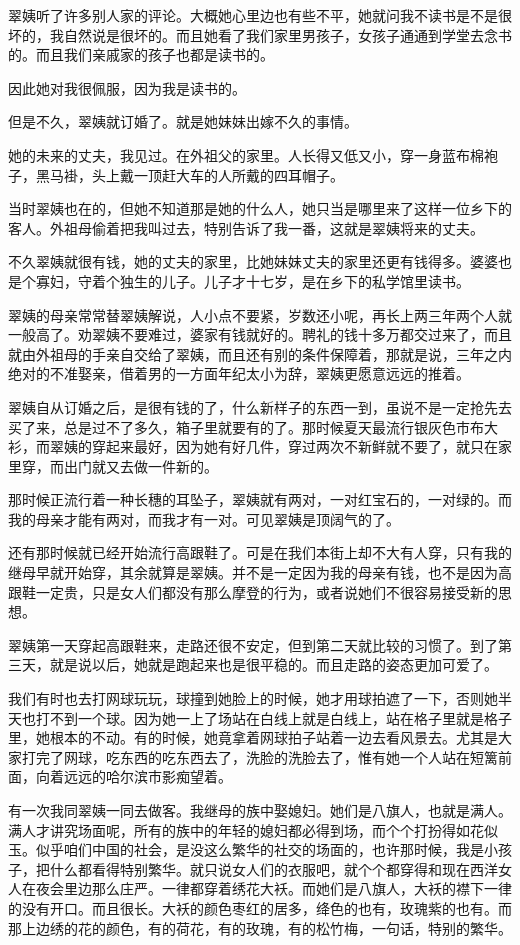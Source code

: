 \par 翠姨听了许多别人家的评论。大概她心里边也有些不平，她就问我不读书是不是很坏的，我自然说是很坏的。而且她看了我们家里男孩子，女孩子通通到学堂去念书的。而且我们亲戚家的孩子也都是读书的。
\par 因此她对我很佩服，因为我是读书的。
\par 但是不久，翠姨就订婚了。就是她妹妹出嫁不久的事情。
\par 她的未来的丈夫，我见过。在外祖父的家里。人长得又低又小，穿一身蓝布棉袍子，黑马褂，头上戴一顶赶大车的人所戴的四耳帽子。
\par 当时翠姨也在的，但她不知道那是她的什么人，她只当是哪里来了这样一位乡下的客人。外祖母偷着把我叫过去，特别告诉了我一番，这就是翠姨将来的丈夫。
\par 不久翠姨就很有钱，她的丈夫的家里，比她妹妹丈夫的家里还更有钱得多。婆婆也是个寡妇，守着个独生的儿子。儿子才十七岁，是在乡下的私学馆里读书。
\par 翠姨的母亲常常替翠姨解说，人小点不要紧，岁数还小呢，再长上两三年两个人就一般高了。劝翠姨不要难过，婆家有钱就好的。聘礼的钱十多万都交过来了，而且就由外祖母的手亲自交给了翠姨，而且还有别的条件保障着，那就是说，三年之内绝对的不准娶亲，借着男的一方面年纪太小为辞，翠姨更愿意远远的推着。
\par 翠姨自从订婚之后，是很有钱的了，什么新样子的东西一到，虽说不是一定抢先去买了来，总是过不了多久，箱子里就要有的了。那时候夏天最流行银灰色市布大衫，而翠姨的穿起来最好，因为她有好几件，穿过两次不新鲜就不要了，就只在家里穿，而出门就又去做一件新的。
\par 那时候正流行着一种长穗的耳坠子，翠姨就有两对，一对红宝石的，一对绿的。而我的母亲才能有两对，而我才有一对。可见翠姨是顶阔气的了。
\par 还有那时候就已经开始流行高跟鞋了。可是在我们本街上却不大有人穿，只有我的继母早就开始穿，其余就算是翠姨。并不是一定因为我的母亲有钱，也不是因为高跟鞋一定贵，只是女人们都没有那么摩登的行为，或者说她们不很容易接受新的思想。
\par 翠姨第一天穿起高跟鞋来，走路还很不安定，但到第二天就比较的习惯了。到了第三天，就是说以后，她就是跑起来也是很平稳的。而且走路的姿态更加可爱了。
\par 我们有时也去打网球玩玩，球撞到她脸上的时候，她才用球拍遮了一下，否则她半天也打不到一个球。因为她一上了场站在白线上就是白线上，站在格子里就是格子里，她根本的不动。有的时候，她竟拿着网球拍子站着一边去看风景去。尤其是大家打完了网球，吃东西的吃东西去了，洗脸的洗脸去了，惟有她一个人站在短篱前面，向着远远的哈尔滨市影痴望着。
\par 有一次我同翠姨一同去做客。我继母的族中娶媳妇。她们是八旗人，也就是满人。满人才讲究场面呢，所有的族中的年轻的媳妇都必得到场，而个个打扮得如花似玉。似乎咱们中国的社会，是没这么繁华的社交的场面的，也许那时候，我是小孩子，把什么都看得特别繁华。就只说女人们的衣服吧，就个个都穿得和现在西洋女人在夜会里边那么庄严。一律都穿着绣花大袄。而她们是八旗人，大袄的襟下一律的没有开口。而且很长。大袄的颜色枣红的居多，绛色的也有，玫瑰紫的也有。而那上边绣的花的颜色，有的荷花，有的玫瑰，有的松竹梅，一句话，特别的繁华。
